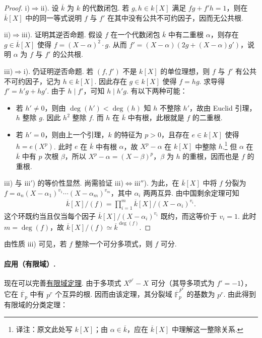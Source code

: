 \begin{proof}
i)$\Rightarrow$ii). 设 $\overline k$ 为 $k$ 的代数闭包. 若 $g,h\in k[X]$ 满足 $fg+f'h=1$，则在 $\overline k[X]$ 中的同一等式说明 $f$ 与 $f'$ 在其中没有公共不可约因子，因而无公共根.

ii)$\Rightarrow$iii). 证明其逆否命题. 假设 $f$ 在一个代数闭包 $\overline k$ 中有二重根 $\alpha$，则存在 $g\in\overline k[X]$ 使得 $f=(X-\alpha)^2\cdot g$. 从而 $f'=(X-\alpha)(2g+(X-\alpha)g')$，说明 $\alpha$ 为 $f$ 与 $f'$ 的公共根.

iii)$\Rightarrow$i). 仍证明逆否命题. 若 $(f,f')$ 不是 $k[X]$ 的单位理想，则 $f$ 与 $f'$ 有公共不可约因子，记为 $h\in k[X]$. 因此存在 $g\in k[X]$ 使得 $f=hg$. 求导得 $f'=h'g+hg'$. 由于 $h\mid f'$，可知 $h\mid h'g$. 有以下两种可能：
\begin{itemize}
\item 若 $h'\ne0$，则由 $\deg(h')<\deg(h)$ 知 $h$ 不整除 $h'$，故由 Euclid 引理，$h$ 整除 $g$. 因此 $h^2$ 整除 $f$. 而 $h$ 在 $\overline k$ 中有根，此根就是 $f$ 的二重根.
\item 若 $h'=0$，则由上一个引理，$k$ 的特征为 $p>0$，且存在 $e\in k[X]$ 使得 $h=e(X^p)$. 此时 $e$ 在 $\overline k$ 中有根 $\alpha$，故 $X^p-\alpha$ 在 $k[X]$ 中整除 $h$.\footnote{译注：原文此处写 $k[X]$；由 $\alpha\in\overline k$，应在 $\overline k[X]$ 中理解这一整除关系.} 但 $\alpha$ 在 $\overline k$ 中有 $p$ 次根 $\beta$，所以 $X^p-\alpha=(X-\beta)^p$，$\beta$ 为 $h$ 的重根，因而也是 $f$ 的重根.
\end{itemize}
iii) 与 iii$'$) 的等价性显然. 尚需验证 iii)$\Leftrightarrow$iii$''$). 为此，在 $\overline k[X]$ 中将 $f$ 分裂为 $f=a_n(X-\alpha_1)^{v_1}\cdots(X-\alpha_m)^{v_m}$，其中 $\alpha_i$ 两两互异. 由中国剩余定理可知
\begin{align*}
\overline k[X]/(f)=\prod_{i=1}^m\overline k[X]/(X-\alpha_i)^{v_i}.
\end{align*}
这个环既约当且仅当每个因子 $\overline k[X]/(X-\alpha_i)^{v_i}$ 既约，而这等价于 $v_i=1$. 此时 $m=\deg(f)$，故 $\overline k[X]/(f)\simeq\overline k^{\deg(f)}$.
\end{proof}
\begin{remark*}
由性质 iii) 可见，若 $f$ 整除一个可分多项式，则 $f$ 可分.
\end{remark*}
\paragraph{应用（有限域）.}
现在可以完善\hyperref[sec:galois-2-4-4]{有限域定理}. 由于多项式 $X^{p^r}-X$ 可分（其导多项式为 $f'=-1$），它在 $\overline{\mathbb F}_p$ 中有 $p^r$ 个互异的根. 因而由该定理，其分裂域 $\overline{\mathbb F}_p^{F^r}$ 的基数为 $p^r$. 由此得到有限域的分类定理：
